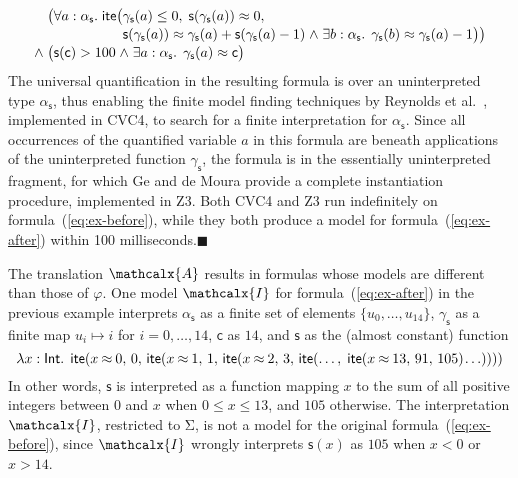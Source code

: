 \documentclass[runningheads,a4paper]{llncs}
\newcommand{\con}[1]{\mathsf{#1}}
\let\const=\con
\let\oldSigma=\Sigma
\def\Sigma{\mathrm{\oldSigma}}
\let\oldwedge=\wedge
\def\wedge{\mathrel{\oldwedge}}
\newcommand\cvc{CVC4\xspace}
\newcommand\ziii{Z3\xspace}
\newcommand{\teq}{\approx}
\newcommand{\I}{\mathcalx{I}}
\newcommand{\conv}{\mathcalx{A}}
\newcommand{\typeint}{\ty{Int}}
\newcommand\ty[1]{\con{#1}}
\newcommand{\lite}{\con{ite}}
\newcommand\concret{\gamma} %
\newcommand{\farg}[1]{\concret_{#1}}
\newcommand{\fargtype}[1]{\alpha_{#1}}
\newcommand{\rem}[1]{\textcolor{red}{[#1]}}
\newcommand{\ct}[1]{\rem{#1 --ct}}
\newcommand{\negvthinspace}{\kern-0.083333em}
\newcommand\xend{{\hfill$\scriptstyle\blacksquare$}}
\begin{document}
\begin{example}
\begin{equation}
\begin{aligned}[c]
  & \phantom{{\wedge}\; }\bigl(
      \forall a : \fargtype{\con{s}}.\; \lite\bigl(
        \!\begin{aligned}[t]
         &  \farg{\con{s}}( a ) \leq 0,\;
          \con{s}(\farg{\con{s}}( a )) \teq 0,\;
\\[-\jot]
  & \con{s}(\farg{\con{s}}( a )) \teq \farg{\con{s}}( a ) + \con{s}( \farg{\con{s}}( a )-1 )
    \wedge \exists b : {\fargtype{\con{s}}}.\;\, \farg{\con{s}}( b ) \teq \farg{\con{s}}( a )-1 \bigr) \bigr)
\end{aligned}
\\[-\jot]
 & {\wedge}\; \bigl( \con{s}( \con{c} ) > 100 \wedge \exists a : {\fargtype{\con{s}}}.\;\, \farg{\con{s}}( a ) \teq \con{c} \bigr)
\end{aligned}
\end{equation}
%
The universal quantification in the resulting formula is over an uninterpreted
type $\fargtype{\con{s}}$, thus enabling the finite model finding
techniques by Reynolds et al.\ \cite{ReyEtAl-1-RR-13,reynolds-et-al-2013},
implemented in \cvc, to search for a finite interpretation for $\fargtype{\con{s}}$. 
Since all occurrences of the quantified variable $a$ in this formula are 
beneath applications of the uninterpreted function $\farg{\con{s}}$, 
the formula is in the essentially uninterpreted fragment,
for which Ge and de Moura \cite{GeDeM-CAV-09} provide 
a complete instantiation procedure, implemented in \ziii. 
Both
\cvc and \ziii run indefinitely on formula~(\ref{eq:ex-before}), 
while they both produce a model for formula~(\ref{eq:ex-after}) 
within 100 milliseconds.\xend
\end{example}

The translation $\conv$ results in formulas whose models are different than those of $\varphi$.
One model $\I$ for formula~(\ref{eq:ex-after}) in the previous example interprets
$\fargtype{\con{s}}$ as a finite set of elements $\{ u_0, \ldots, u_{14} \}$,
$\farg{\con{s}}$ as a finite map $u_i \mapsto i$ for $i = 0, \ldots, 14$,
$\con{c}$ as $14$,
and $\con{s}$ as the (almost constant) function
%
\begin{equation} \label{eq:approx-interp}
\lambda x : \typeint.\;\, \lite( x \mathbin{\teq} 0,\, 0,\,
  \lite( x \mathbin{\teq} 1,\, 1,\,
    \lite( x \mathbin{\teq} 2,\, 3,\,
      \lite(\ldots,\; \lite( x \mathbin{\teq} 13,\, 91,\, 105 )\negvthinspace \ldots ))))
\end{equation}
%
In other words, $\const{s}$ is interpreted as a function mapping $x$ to the sum
of all positive integers between $0$ and $x$ when $0 \leq x \leq 13$, and $105$
otherwise.
The interpretation $\I$, restricted to $\Sigma$, is {not} a model for the original formula~(\ref{eq:ex-before}),
since $\I$ wrongly interprets $\con{s}( x )$ as $105$ when $x < 0$ or $x > 14$.
\end{document}
